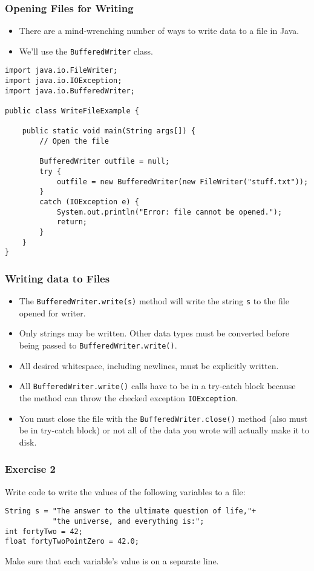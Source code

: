 \documentclass[cmptslides]{cmpt280-slidesandsolutions}
\begin{document}
\begin{frame}[fragile]
\frametitle{Opening Files for Writing}
\begin{itemize}
	\item There are a mind-wrenching number of ways to write data to a file in Java.
	\item We'll use the \lstinline{BufferedWriter} class.
\end{itemize}	
\begin{lstlisting}[basicstyle=\tt\tiny]
import java.io.FileWriter;
import java.io.IOException;
import java.io.BufferedWriter;

public class WriteFileExample {

    public static void main(String args[]) {
        // Open the file

        BufferedWriter outfile = null;
        try {
            outfile = new BufferedWriter(new FileWriter("stuff.txt"));
        }
        catch (IOException e) {
            System.out.println("Error: file cannot be opened.");
            return;
        }
    }
}	
\end{lstlisting}
\end{frame}

\begin{frame}
\frametitle{Writing data to Files}
\begin{itemize}
	\item The \lstinline{BufferedWriter.write(s)} method will write the string \lstinline{s} to the file opened for writer.
	\item Only strings may be written.  Other data types must be converted before being passed to \lstinline{BufferedWriter.write()}.
	\item All desired whitespace, including newlines, must be explicitly written.
	\item All \lstinline{BufferedWriter.write()} calls have to be in a try-catch block because the method can throw the checked exception \lstinline{IOException}.
	\item You must close the file with the \lstinline{BufferedWriter.close()} method (also must be in try-catch block) or not all of the data you wrote will actually make it to disk.
\end{itemize}
\end{frame}


\begin{frame}[fragile]
\frametitle{Exercise 2}
Write code to write the values of the following variables to a file:
\begin{lstlisting}[basicstyle=\tt\scriptsize]
String s = "The answer to the ultimate question of life,"+
           "the universe, and everything is:";
int fortyTwo = 42;
float fortyTwoPointZero = 42.0;
\end{lstlisting}	
Make sure that each variable's value is on a separate line.
\end{frame}
\end{document}
